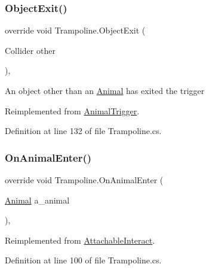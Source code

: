 \subsubsection{\texorpdfstring{Object\+Exit()}{ObjectExit()}}
{\footnotesize\ttfamily override void Trampoline.\+Object\+Exit (\begin{DoxyParamCaption}\item[{Collider}]{other }\end{DoxyParamCaption})\hspace{0.3cm}{\ttfamily [protected]}, {\ttfamily [virtual]}}



An object other than an \mbox{\hyperlink{class_animal}{Animal}} has exited the trigger 



Reimplemented from \mbox{\hyperlink{class_animal_trigger_aad4a0cd7f224897b7d810429e05b038a}{Animal\+Trigger}}.



Definition at line 132 of file Trampoline.\+cs.

\mbox{\label{class_trampoline_a593abd52ed17139a320ee418aff6b120}} 
\subsubsection{\texorpdfstring{On\+Animal\+Enter()}{OnAnimalEnter()}}
{\footnotesize\ttfamily override void Trampoline.\+On\+Animal\+Enter (\begin{DoxyParamCaption}\item[{\mbox{\hyperlink{class_animal}{Animal}}}]{a\+\_\+animal }\end{DoxyParamCaption})\hspace{0.3cm}{\ttfamily [protected]}, {\ttfamily [virtual]}}



Reimplemented from \mbox{\hyperlink{class_attachable_interact_a376127af23be5456604ee5ec39f02b9b}{Attachable\+Interact}}.



Definition at line 100 of file Trampoline.\+cs.

\mbox{\label{class_trampoline_a2bb01ad135e9dfe5ad5685aaea9936c9}} 
